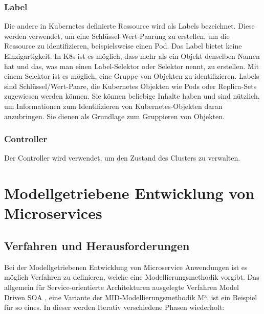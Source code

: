 {\subsubsection{Label}

Die andere in Kubernetes definierte Ressource wird als Labels bezeichnet. Diese werden verwendet, um eine Schlüssel-Wert-Paarung zu erstellen, um die Ressource zu identifizieren, beispielsweise einen Pod. Das Label bietet keine Einzigartigkeit. In K8s ist es möglich, dass mehr als ein Objekt denselben Namen hat und das, was man einen Label-Selektor oder Selektor nennt, zu erstellen.
Mit einem Selektor ist es möglich, eine Gruppe von Objekten zu identifizieren. \cite[S.80-81]{riti}
Labels sind Schlüssel/Wert-Paare, die Kubernetes Objekten wie Pods oder Replica-Sets zugewiesen werden können. Sie können beliebige Inhalte haben und sind nützlich, um Informationen zum Identifizieren von Kubernetes-Objekten daran anzubringen. Sie dienen als Grundlage zum Gruppieren von Objekten. \cite[S.???]{burns1}

\subsubsection{Controller}

Der Controller wird verwendet, um den Zustand des Clusters zu verwalten. \cite[S.80-81]{riti}


%
%

\pagebreak 
\section{Modellgetriebene Entwicklung von Microservices}

\subsection{Verfahren und Herausforderungen}

Bei der Modellgetriebenen Entwicklung von Microservice Anwendungen ist es möglich Verfahren zu definieren, welche eine Modellierungsmethodik vorgibt. Das allgemein für Service-orientierte Architekturen ausgelegte Verfahren Model Driven SOA , eine Variante der MID-Modellierungsmethodik M³, ist ein Beispiel für so eines. In dieser werden Iterativ verschiedene Phasen wiederholt:

}
